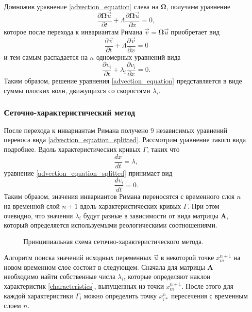 Домножив уравнение \ref{advection_equation} слева на $\mathbf\Omega$, получаем уравнение
\begin{equation}
\frac{\partial{\mathbf\Omega{\vec u}}}{\partial t}+
\Lambda\frac{\partial{\mathbf\Omega{\vec u}}}{\partial x}=0,
\end{equation}
которое после перехода к инвариантам Римана ${\vec v}=\mathbf\Omega{\vec u}$ приобретает вид
\begin{equation}
\frac{\partial{\vec v}}{\partial t}+
\Lambda\frac{\partial{\vec v}}{\partial x}=0
\end{equation}
и тем самым распадается на $n$ одномерных уравнений вида
\begin{equation}
\frac{\partial{v_i}}{\partial t}+\lambda_i\frac{\partial{v_i}}{\partial x}=0.
\label{advection_equation_splitted}
\end{equation}
Таким образом, решение уравнения \ref{advection_equation} представляется в виде
суммы плоских волн, движущихся со скоростями $\lambda_i$.


\subsubsection{Сеточно-характеристический метод}
\label{sec:gcm_method_idea}

После перехода к инвариантам Римана получено 9 независимых уравнений переноса вида \ref{advection_equation_splitted}. Рассмотрим уравнение такого вида подробнее. Вдоль характеристических кривых $\Gamma$, таких что
\begin{equation}
\label{characteristics}
\frac{dx}{dt} = \lambda,
\end{equation}
уравнение \ref{advection_equation_splitted} принимает вид 
\begin{equation}
\label{characteristic_equation}
\frac{dv_i}{dt} = 0.
\end{equation}
Таким образом, значения инвариантов Римана переносятся с временного слоя $n$ на временной слой $n+1$ вдоль характеристических кривых $\Gamma$. При этом очевидно, что значения $\lambda_i$ будут разные в зависимости от вида матрицы $\mathbf A$, который определяется используемыми реологическими соотношениями.

\begin{figure}[h]
\caption{Принципиальная схема сеточно-характеристического метода.}
\end{figure}

Алгоритм поиска значений исходных переменных $\vec u$ в некоторой точке $x_m^{n+1}$ на новом временном слое состоит в следующем. Сначала для матрицы $\mathbf A$ необходимо найти собственные числа $\lambda_i$, которые определяют наклон характеристик \ref{characteristics}, выпущенных из точки $x_m^{n+1}$. После этого для каждой характеристики $\Gamma_i$ можно определить точку $x_{i*}^n$ пересечения с временным слоем $n$.

